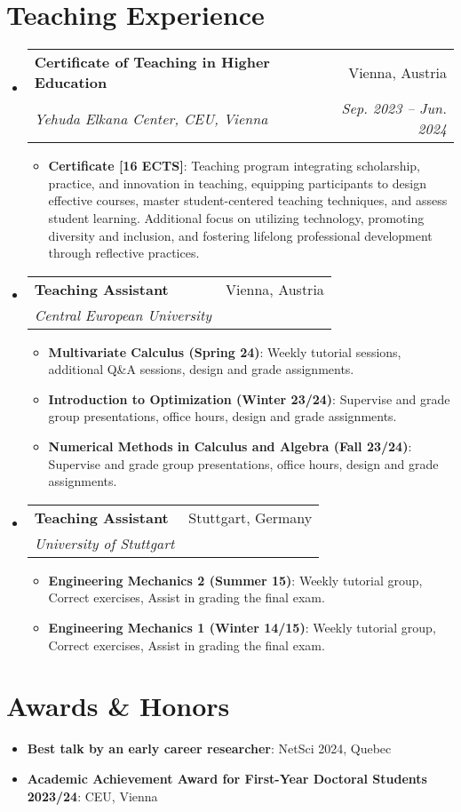 \documentclass[letterpaper,11pt]{article}
\makeatletter
\newcommand{\resumeItem}[2]{
  \item\small{ \textbf{#1}{: #2 \vspace{-2pt}} } }
\newcommand{\resumeSubheading}[4]{ \vspace{-1pt}\item
    \begin{tabular*}{0.97\textwidth}{l@{\extracolsep{\fill}}r} \textbf{#1} & #2
      \\
      \textit{\small#3} & \textit{\small #4} \\
    \end{tabular*}\vspace{-5pt} }
\newcommand{\resumeSubItem}[2]{\resumeItem{#1}{#2}\vspace{-4pt}}
\newcommand{\resumeSubHeadingListStart}{\begin{itemize}[leftmargin=*]}
\newcommand{\resumeSubHeadingListEnd}{\end{itemize}}
\newcommand{\resumeItemListStart}{\begin{itemize}}
\newcommand{\resumeItemListEnd}{\end{itemize}\vspace{-5pt}}
\makeatother
\begin{document}
\section{Teaching Experience}
  \resumeSubHeadingListStart

    \resumeSubheading {Certificate of Teaching in Higher Education}{Vienna,
    Austria} {Yehuda Elkana Center, CEU, Vienna}{Sep. 2023 -- Jun. 2024}
    \resumeItemListStart \resumeItem{Certificate [16 ECTS]}{Teaching program
    integrating scholarship, practice, and innovation in teaching, equipping
    participants to design effective courses, master student-centered teaching
    techniques, and assess student learning. Additional focus on utilizing
    technology, promoting diversity and inclusion, and fostering lifelong
    professional development through reflective practices.} \resumeItemListEnd

    \resumeSubheading {Teaching Assistant}{Vienna, Austria} {Central European
    University}{} \resumeItemListStart \resumeItem{Multivariate Calculus (Spring
    24)}{Weekly tutorial sessions, additional Q\&A sessions, design and grade
    assignments.} \resumeItem{Introduction to Optimization (Winter
    23/24)}{Supervise and grade group presentations, office hours, design and
    grade assignments.} \resumeItem{Numerical Methods in Calculus and Algebra
    (Fall 23/24)}{Supervise and grade group presentations, office hours, design
    and grade assignments.} \resumeItemListEnd

    \resumeSubheading {Teaching Assistant}{Stuttgart, Germany} {University of
    Stuttgart}{} \resumeItemListStart \resumeItem{Engineering Mechanics 2
    (Summer 15)}{Weekly tutorial group, Correct exercises, Assist in grading the
    final exam.} \resumeItem{Engineering Mechanics 1 (Winter 14/15)}{Weekly
    tutorial group, Correct exercises, Assist in grading the final exam.}
    \resumeItemListEnd

  \resumeSubHeadingListEnd





  \section{Awards \& Honors}
  \resumeSubHeadingListStart \resumeSubItem{Best talk by an early career
    researcher} {NetSci 2024, Quebec} \resumeSubItem{Academic Achievement Award
    for First-Year Doctoral Students 2023/24} {CEU, Vienna}
    \resumeSubHeadingListEnd
\end{document}
